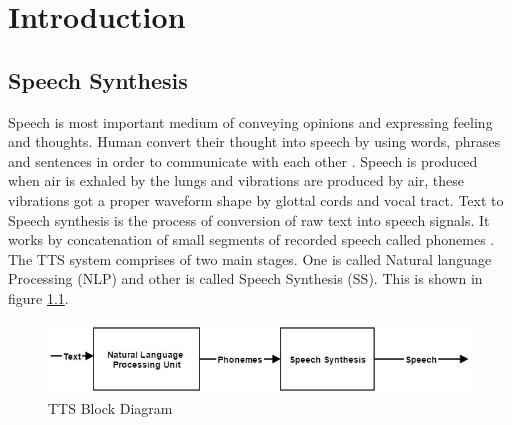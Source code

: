 \chapter{Introduction}

\section{Speech Synthesis}

Speech is most important medium of conveying opinions and expressing feeling and thoughts.
Human convert their thought into speech by using words, phrases and sentences in order to communicate with each other \cite{mumtaz2016break}. 
Speech is produced when air is exhaled by the lungs and vibrations are produced by air, these vibrations got a 
proper waveform shape by glottal cords and vocal tract. Text to Speech synthesis is the process of conversion of raw text into 
speech signals. It works by concatenation of small segments of recorded speech called phonemes \cite{khilari2015review}.
The TTS system comprises of two main stages. One is called Natural language Processing (NLP) and
other is called Speech Synthesis (SS). This is shown in figure \ref{fig:TTS Block Diagram}.

\begin{center}
\begin{figure}[hbtp]
\centering
  \includegraphics[width=\linewidth]{images/tts_bd.jpg}
  \caption{TTS Block Diagram}
  \label{fig:TTS Block Diagram}
\end{figure}

\end{center}


